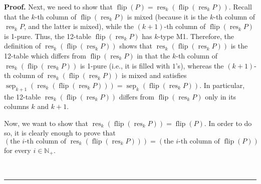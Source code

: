 \documentclass[numbers=enddot,12pt,final,onecolumn,notitlepage]{scrartcl}%
\theoremstyle{definition}
\newenvironment{proof}[1][Proof]{\noindent\textbf{#1.} }{\ \rule{0.5em}{0.5em}}
\begin{document}
\begin{proof}
Next, we need to show that $\operatorname*{flip}\left(  P\right)
=\operatorname*{res}\nolimits_{k}\left(  \operatorname*{flip}\left(
\operatorname*{res}\nolimits_{k}P\right)  \right)  $. Recall that the $k$-th
column of $\operatorname*{flip}\left(  \operatorname*{res}\nolimits_{k}%
P\right)  $ is mixed (because it is the $k$-th column of $\operatorname*{res}%
\nolimits_{k}P$, and the latter is mixed), while the $\left(  k+1\right)  $-th
column of $\operatorname*{flip}\left(  \operatorname*{res}\nolimits_{k}%
P\right)  $ is 1-pure. Thus, the 12-table $\operatorname*{flip}\left(
\operatorname*{res}\nolimits_{k}P\right)  $ has $k$-type M1. Therefore, the
definition of $\operatorname*{res}\nolimits_{k}\left(  \operatorname*{flip}%
\left(  \operatorname*{res}\nolimits_{k}P\right)  \right)  $ shows that
$\operatorname*{res}\nolimits_{k}\left(  \operatorname*{flip}\left(
\operatorname*{res}\nolimits_{k}P\right)  \right)  $ is the 12-table which
differs from $\operatorname*{flip}\left(  \operatorname*{res}\nolimits_{k}%
P\right)  $ in that the $k$-th column of $\operatorname*{res}_{k}\left(
\operatorname*{flip}\left(  \operatorname*{res}\nolimits_{k}P\right)  \right)
$ is 1-pure (i.e., it is filled with $1$'s), whereas the $\left(  k+1\right)
$-th column of $\operatorname*{res}\nolimits_{k}\left(  \operatorname*{flip}%
\left(  \operatorname*{res}\nolimits_{k}P\right)  \right)  $ is mixed and
satisfies \newline$\operatorname*{sep}\nolimits_{k+1}\left(
\operatorname*{res}\nolimits_{k}\left(  \operatorname*{flip}\left(
\operatorname*{res}\nolimits_{k}P\right)  \right)  \right)
=\operatorname*{sep}\nolimits_{k}\left(  \operatorname*{flip}\left(
\operatorname*{res}\nolimits_{k}P\right)  \right)  $. In particular, the
12-table $\operatorname*{res}\nolimits_{k}\left(  \operatorname*{flip}\left(
\operatorname*{res}\nolimits_{k}P\right)  \right)  $ differs from
$\operatorname*{flip}\left(  \operatorname*{res}\nolimits_{k}P\right)  $ only
in its columns $k$ and $k+1$.

Now, we want to show that $\operatorname*{res}\nolimits_{k}\left(
\operatorname*{flip}\left(  \operatorname*{res}\nolimits_{k}P\right)  \right)
=\operatorname*{flip}\left(  P\right)  $. In order to do so, it is clearly
enough to prove that%
\begin{equation}
\left(  \text{the }i\text{-th column of }\operatorname*{res}\nolimits_{k}%
\left(  \operatorname*{flip}\left(  \operatorname*{res}\nolimits_{k}P\right)
\right)  \right)  =\left(  \text{the }i\text{-th column of }%
\operatorname*{flip}\left(  P\right)  \right)
\label{pf.lem.BK.res.flip.pf.c3.icol}%
\end{equation}
for every $i\in\mathbb{N}_{+}$.


\end{proof}
\end{document}
